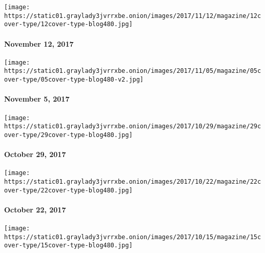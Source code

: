 \href{https://www.nytimes3xbfgragh.onion/interactive/2017/11/07/magazine/tech-design-future-autonomous-cars-american-interstate-highway-roads-suburbs.html}{}

\texttt{[image: https://static01.graylady3jvrrxbe.onion/images/2017/11/12/magazine/12cover-type/12cover-type-blog480.jpg]}

\hypertarget{november-12-2017}{%
\paragraph{November 12, 2017}\label{november-12-2017}}

\href{https://www.nytimes3xbfgragh.onion/issue/magazine/2017/11/03/110517-issue}{}

\texttt{[image: https://static01.graylady3jvrrxbe.onion/images/2017/11/05/magazine/05cover-type/05cover-type-blog480-v2.jpg]}

\hypertarget{november-5-2017}{%
\paragraph{November 5, 2017}\label{november-5-2017}}

\href{https://www.nytimes3xbfgragh.onion/issue/magazine/2017/10/27/102917-issue}{}

\texttt{[image: https://static01.graylady3jvrrxbe.onion/images/2017/10/29/magazine/29cover-type/29cover-type-blog480.jpg]}

\hypertarget{october-29-2017}{%
\paragraph{October 29, 2017}\label{october-29-2017}}

\href{https://www.nytimes3xbfgragh.onion/issue/magazine/2017/10/20/102217-issue}{}

\texttt{[image: https://static01.graylady3jvrrxbe.onion/images/2017/10/22/magazine/22cover-type/22cover-type-blog480.jpg]}

\hypertarget{october-22-2017}{%
\paragraph{October 22, 2017}\label{october-22-2017}}

\href{https://www.nytimes3xbfgragh.onion/issue/magazine/2017/10/13/101517-issue}{}

\texttt{[image: https://static01.graylady3jvrrxbe.onion/images/2017/10/15/magazine/15cover-type/15cover-type-blog480.jpg]}

